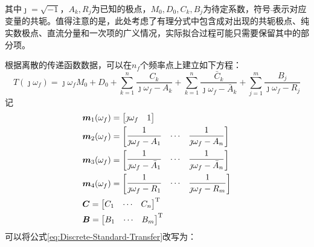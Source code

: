 其中$\jmath=\sqrt{-1}$，$A_k, R_j$为已知的极点，$M_0, D_0, C_k, B_j$为待定系数，符号$\bar{}$表示对应变量的共轭。值得注意的是，此处考虑了有理分式中包含成对出现的共轭极点、纯实数极点、直流分量和一次项的广义情况，实际拟合过程可能只需要保留其中的部分项。

根据离散的传递函数数据，可以在$n_f$个频率点上建立如下方程：
\begin{equation}
  \label{eq:Discrete-Standard-Transfer}
  T(\jmath\omega_f)=\jmath\omega_f M_0+ D_0+ \sum_{k=1}^{n}\frac{C_k}{\jmath\omega_f-A_k}+ \sum_{k=1}^{n}\frac{\bar{C}_k}{\jmath\omega_f- \bar{A}_k}+ \sum_{j=1}^{m} \frac{B_j}{\jmath\omega_f -R_j}
\end{equation}
记
\begin{align}
   & \boldsymbol{m}_1(\omega_f)=\left[ \begin{matrix}
      \jmath\omega_f & 1
    \end{matrix} \right] \nonumber \\
   & \boldsymbol{m}_2(\omega_f)=\left[ \begin{matrix}
      \displaystyle{\frac{1}{\jmath \omega_f-A_1}} & \cdots & \displaystyle{\frac{1}{\jmath \omega_f-A_n}} \\
    \end{matrix} \right] \nonumber \\
   & \boldsymbol{m}_3(\omega_f)=\left[ \begin{matrix}
      \displaystyle{\frac{1}{\jmath \omega_f-\bar{A}_1}} & \cdots & \displaystyle{\frac{1}{\jmath \omega_f-\bar{A}_n}} \\
    \end{matrix} \right]           \\
   & \boldsymbol{m}_4(\omega_f)=\left[ \begin{matrix}
      \displaystyle{\frac{1}{\jmath \omega_f-R_1}} & \cdots & \displaystyle{\frac{1}{\jmath \omega_f-R_m}} \\
    \end{matrix} \right] \nonumber \\
   & \boldsymbol{C}=\left[ \begin{matrix}
      C_1 & \cdots & C_n
    \end{matrix} \right]^{\mathrm{T}} \nonumber       \\
   & \boldsymbol{B}=\left[ \begin{matrix}
      B_1 & \cdots & B_m
    \end{matrix} \right]^{\mathrm{T}} \nonumber
\end{align}
可以将公式\eqref{eq:Discrete-Standard-Transfer}改写为：
